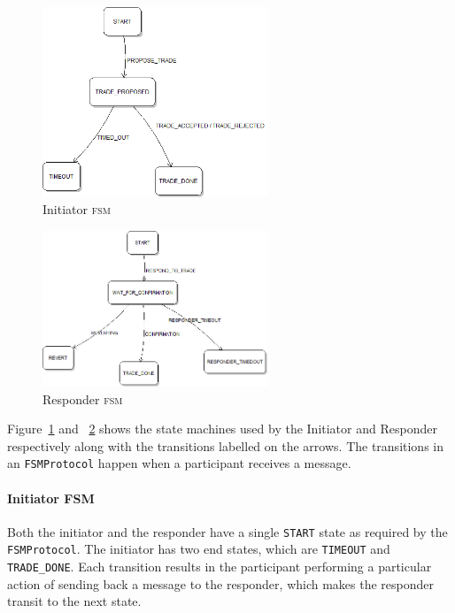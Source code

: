 %
%

\begin{figure}[h!]
	\centering
	\includegraphics[width=0.6\textwidth]{img/protocol-fsm-1.png}
	\caption{Initiator \textsc{fsm}}
	\label{fig:protocol-fsm-1}
\end{figure}

\begin{figure}[h!]
	\centering
	\includegraphics[width=0.6\textwidth]{img/protocol-fsm-2.png}
	\caption{Responder \textsc{fsm}}
	\label{fig:protocol-fsm-2}
\end{figure}

Figure~\ref{fig:protocol-fsm-1} and ~\ref{fig:protocol-fsm-2} shows the state machines used by the Initiator and Responder respectively along with the transitions labelled on the arrows. The transitions in an \texttt{FSMProtocol} happen when a participant receives a message.

\paragraph{Initiator FSM}

Both the initiator and the responder have a single \texttt{START} state as required by the \texttt{FSMProtocol}. The initiator has two end states, which are \texttt{TIMEOUT} and \texttt{TRADE\_DONE}. Each transition results in the participant performing a particular action of sending back a message to the responder, which makes the responder transit to the next state.


